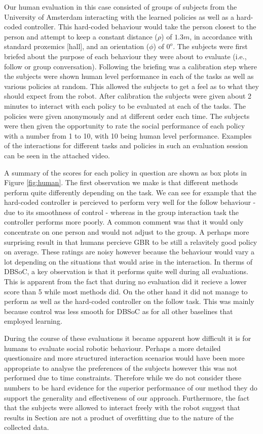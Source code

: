 \documentclass[letterpaper, 10 pt, conference]{ieeeconf}
\begin{document}
Our human evaluation in this case consisted of groups of subjects from the University of Amsterdam interacting with the learned policies as well as a hard-coded controller. This hard-coded behaviour would take the person closest to the person and attempt to keep a constant distance ($\rho$) of $1.3m$, in accordance with standard proxemics [hall], and an orientation ($\phi$) of $0^o$. The subjects were first briefed about the purpose of each behaviour they were about to evaluate (i.e., follow or group conversation). Following the briefing was a calibration step where the subjects were shown human level performance in each of the tasks as well as various policies at random. This allowed the subjects to get a feel as to what they should expect from the robot. After calibration the subjects were given about 2 minutes to interact with each policy to be evaluated at each of the tasks. The policies were given anonymously and at different order each time. The subjects were then given the opportunity to rate the social performance of each policy with a number from 1 to 10, with 10 being human level performance. Examples of the interactions for different tasks and policies in such an evaluation session can be seen in the attached video.

A summary of the scores for each policy in question are shown as box plots in Figure \ref{fig:human}. The first observation we make is that different methods perform quite differently depending on the task. We can see for example that the hard-coded controller is percieved to perform very well for the follow behaviour - due to its smoothness of control - whereas in the group interaction task the controller performs more poorly. A common comment was that it would only concentrate on one person and would not adjust to the group. A perhaps more surprising result in that humans percieve GBR to be still a relavitely good policy on average. These ratings are noisy however because the behaviour would vary a lot depending on the situations that would arise in the interaction. In therms of DBSoC, a key observation is that it performs quite well during all evaluations. This is apparent from the fact that during no evaluation did it recieve a lower score than 5 while most methods did. On the other hand it did not manage to perform as well as the hard-coded controller on the follow task. This was mainly because control was less smooth for DBSoC as for all other baselines that employed learning.

During the course of these evaluations it became apparent how difficult it is for humans to evaluate social robotic behaviour. Perhaps a more detailed questionaire and more structured interaction scenarios would have been more appropriate to analyse the preferences of the subjects however this was not performed due to time constraints. Therefore while we do not consider these numbers to be hard evidence for the superior performance of our method they do support the generality and effectiveness of our approach. Furthermore, the fact that the subjects were allowed to interact freely with the robot suggest that results in Section are not a product of overfitting due to the nature of the collected data. 
\end{document}
